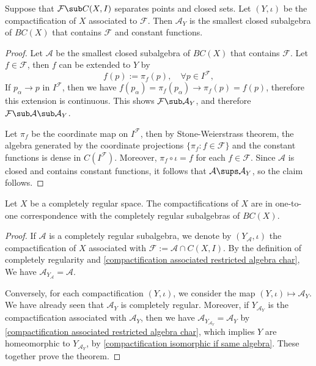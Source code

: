 \begin{proposition}\label{compactification associated restricted algebra char}
Suppose that $\mathcal{F}\sub C(X,I)$ separates points and closed sets. Let $(Y,\iota)$ be the compactification of $X$ associated to $\mathcal{F}$. Then $\mathcal{A}_Y$ is the smallest closed subalgebra of $BC(X)$ that contains $\mathcal{F}$ and constant functions.
\end{proposition}
\begin{proof}
Let $\mathcal{A}$ be the smallest closed subalgebra of $BC(X)$ that contains $\mathcal{F}$. Let $f\in\mathcal{F}$, then $f$ can be extended to $Y$ by
\[f(p):=\pi_f(p),\quad\forall p\in I^\mathcal{F},\]
If $p_\alpha\to p$ in $I^\mathcal{F}$, then we have $f(p_\alpha)=\pi_f(p_\alpha)\to\pi_f(p)=f(p)$, therefore this extension is continuous. This shows $\mathcal{F}\sub\mathcal{A}_Y$, and therefore $\mathcal{F}\sub\mathcal{A}\sub\mathcal{A}_Y$.\par
Let $\pi_f$ be the coordinate map on $I^\mathcal{F}$, then by Stone-Weierstrass theorem, the algebra generated by the coordinate projections $\{\pi_f:f\in\mathcal{F}\}$ and the constant functions is dense in $C(I^\mathcal{F})$. Moreover, $\pi_f\circ\iota=f$ for each $f\in\mathcal{F}$. Since $\mathcal{A}$ is closed and contains constant functions, it follows that $\mathcal{A}\sups\mathcal{A}_Y$, so the claim follows.
\end{proof}
\begin{theorem}
Let $X$ be a completely regular space. The compactifications of $X$ are in one-to-one correspondence with the completely regular subalgebras of $BC(X)$.
\end{theorem}
\begin{proof}
If $\mathcal{A}$ is a completely regular subalgebra, we denote by $(Y_{\mathcal{A}},\iota)$ the compactification of $X$ associated with $\mathcal{F}:=\mathcal{A}\cap C(X,I)$. By the definition of completely regularity and \cref{compactification associated restricted algebra char}, We have $\mathcal{A}_{Y_{\mathcal{A}}}=\mathcal{A}$.\par
Conversely, for each compactification $(Y,\iota)$, we consider the map $(Y,\iota)\mapsto\mathcal{A}_Y$. We have already seen that $\mathcal{A}_Y$ is completely regular. Moreover, if $Y_{\mathcal{A}_Y}$ is the compactification associated with $\mathcal{A}_Y$, then we have $\mathcal{A}_{Y_{\mathcal{A}_Y}}=\mathcal{A}_Y$ by \cref{compactification associated restricted algebra char}, which implies $Y$ are homeomorphic to $Y_{\mathcal{A}_Y}$, by \cref{compactification isomorphic if same algebra}. These together prove the theorem.
\end{proof}
